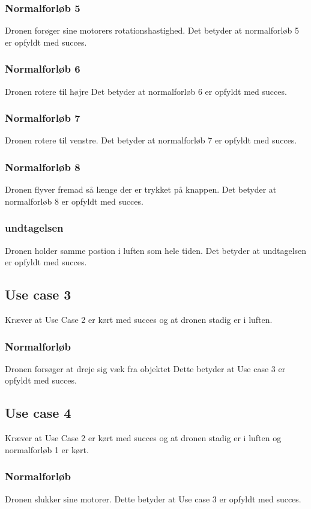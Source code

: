 \documentclass[Main]{subfiles}
\begin{document}
\subsubsection{Normalforløb 5}
Dronen forøger sine motorers rotationshastighed.
Det betyder at normalforløb 5 er opfyldt med succes.

\subsubsection{Normalforløb 6}
Dronen rotere til højre
Det betyder at normalforløb 6 er opfyldt med succes.

\subsubsection{Normalforløb 7}
Dronen rotere til venstre.
Det betyder at normalforløb 7 er opfyldt med succes.

\subsubsection{Normalforløb 8}
Dronen flyver fremad så længe der er trykket på knappen.
Det betyder at normalforløb 8 er opfyldt med succes.

\subsubsection{undtagelsen}
Dronen holder samme postion i luften som hele tiden.
Det betyder at undtagelsen er opfyldt med succes.


\subsection{Use case 3}
Kræver at Use Case 2 er kørt med succes og at dronen stadig er i luften.
\subsubsection{Normalforløb}
Dronen forsøger at dreje sig væk fra objektet 
Dette betyder at Use case 3 er opfyldt med succes.

\subsection{Use case 4}
Kræver at Use Case 2 er kørt med succes og at dronen stadig er i luften og normalforløb 1 er kørt.
\subsubsection{Normalforløb}
Dronen slukker sine motorer.
Dette betyder at Use case 3 er opfyldt med succes.
\end{document}
